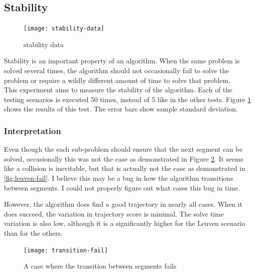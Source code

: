 \subsection{Stability}
\label{subsec:stability}
\begin{figure}[]
	\centering
	\texttt{[image: stability-data]}
	\caption{stability data}
	\label{fig:stability-data}
\end{figure}
Stability is an important property of an algorithm. When the same problem is solved several times, the algorithm should not occasionally fail to solve the problem or require a wildly different amount of time to solve that problem. \\
This experiment aims to measure the stability of the algorithm. Each of the testing scenarios is executed 50 times, instead of 5 like in the other tests. Figure \ref{fig:stability-data} shows the results of this test. The error bars show sample standard deviation. \\

\subsubsection{Interpretation}
Even though the each sub-problem should ensure that the next segment can be solved, occasionally this was not the case as demonstrated in Figure \ref{fig:transition-fail}. It seems like a collision is inevitable, but that is actually not the case as demonstrated in \ref{fig:leuven-fail}. I believe this may be a bug in how the algorithm transitions between segments. I could not properly figure out what cases this bug in time.
\par
However, the algorithm does find a good trajectory in nearly all cases. When it does succeed, the variation in trajectory score is minimal. The solve time variation is also low, although it is a significantly higher for the Leuven scenario than for the others.
\begin{figure}[]
	\centering
	\texttt{[image: transition-fail]}
	\caption{A case where the transition between segments fails}
	\label{fig:transition-fail}
\end{figure}

